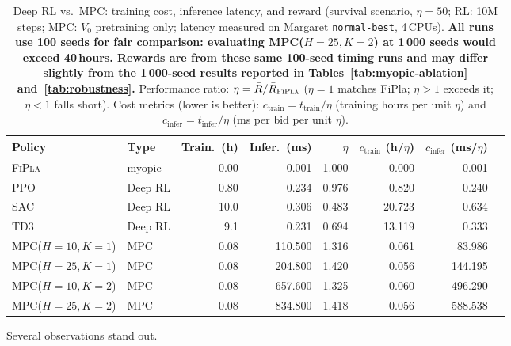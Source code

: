\documentclass[11pt]{article}
\begin{document}
\begin{table}[h!]
\centering
\small
\caption{Deep RL vs.\ MPC: training cost, inference latency, and reward
         (survival scenario, $\eta{=}50$; RL: 10M steps; MPC: $V_0$ pretraining only;
         latency measured on Margaret \texttt{normal-best}, 4\,CPUs).
         \textbf{All runs use 100 seeds for fair comparison: evaluating
         \textsc{MPC}($H{=}25,K{=}2$) at 1\,000 seeds would exceed 40\,hours.
         Rewards are from these same 100-seed timing runs and may differ slightly
         from the 1\,000-seed results reported in Tables~\ref{tab:myopic-ablation}
         and~\ref{tab:robustness}.}
         Performance ratio: $\eta = \bar{R}/\bar{R}_{\textsc{FiPla}}$
         ($\eta{=}1$ matches FiPla; $\eta{>}1$ exceeds it; $\eta{<}1$ falls short).
         Cost metrics (lower is better):
         $c_{\text{train}} = t_{\text{train}}/\eta$ (training hours per unit $\eta$) and
         $c_{\text{infer}} = t_{\text{infer}}/\eta$ (ms per bid per unit $\eta$).}
\label{tab:rl-vs-mpc}
\begin{tabular}{llrrrrrr}
\toprule
Policy & Type & Train.\ (h) & Infer.\ (ms) & $\eta$ & $c_{\text{train}}$ (h/$\eta$) & $c_{\text{infer}}$ (ms/$\eta$) \\
\midrule
\textsc{FiPla}                      & myopic     & 0.00   &   0.001 & 1.000 &   0.000 &     0.001 \\
\textsc{PPO}                        & Deep RL    & 0.80   &   0.234 & 0.976 &   0.820 &     0.240 \\
\textsc{SAC}                        & Deep RL    & 10.0   &   0.306 & 0.483 &  20.723 &     0.634 \\
\textsc{TD3}                        & Deep RL    &  9.1   &   0.231 & 0.694 &  13.119 &     0.333 \\
\textsc{MPC}($H{=}10,K{=}1$)       & MPC        & 0.08   & 110.500 & 1.316 &   0.061 &    83.986 \\
\textsc{MPC}($H{=}25,K{=}1$)       & MPC        & 0.08   & 204.800 & 1.420 &   0.056 &   144.195 \\
\textsc{MPC}($H{=}10,K{=}2$)       & MPC        & 0.08   & 657.600 & 1.325 &   0.060 &   496.290 \\
\textsc{MPC}($H{=}25,K{=}2$)       & MPC        & 0.08   & 834.800 & 1.418 &   0.056 &   588.538 \\
\bottomrule
\end{tabular}
\end{table}

Several observations stand out.
\end{document}

